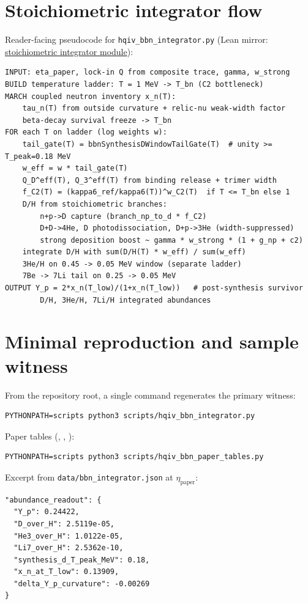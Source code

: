 \documentclass[11pt]{amsart}
\newcommand{\etap}{\ensuremath{\eta_{\mathrm{paper}}}}
\begin{document}
\section{Stoichiometric integrator flow}
\label{app:flow}

Reader-facing pseudocode for \texttt{hqiv\_bbn\_integrator.py} (Lean mirror:
\hyperref[lean:bbn-stoichiometric]{stoichiometric integrator module}):

\begin{verbatim}
INPUT: eta_paper, lock-in Q from composite trace, gamma, w_strong
BUILD temperature ladder: T = 1 MeV -> T_bn (C2 bottleneck)
MARCH coupled neutron inventory x_n(T):
    tau_n(T) from outside curvature + relic-nu weak-width factor
    beta-decay survival freeze -> T_bn
FOR each T on ladder (log weights w):
    tail_gate(T) = bbnSynthesisDWindowTailGate(T)  # unity >= T_peak=0.18 MeV
    w_eff = w * tail_gate(T)
    Q_D^eff(T), Q_3^eff(T) from binding release + trimer width
    f_C2(T) = (kappa6_ref/kappa6(T))^w_C2(T)  if T <= T_bn else 1
    D/H from stoichiometric branches:
        n+p->D capture (branch_np_to_d * f_C2)
        D+D->4He, D photodissociation, D+p->3He (width-suppressed)
        strong deposition boost ~ gamma * w_strong * (1 + g_np + c2)
    integrate D/H with sum(D/H(T) * w_eff) / sum(w_eff)
    3He/H on 0.45 -> 0.05 MeV window (separate ladder)
    7Be -> 7Li tail on 0.25 -> 0.05 MeV
OUTPUT Y_p = 2*x_n(T_low)/(1+x_n(T_low))   # post-synthesis survivor
        D/H, 3He/H, 7Li/H integrated abundances
\end{verbatim}

\section{Minimal reproduction and sample witness}
\label{app:minimal-repro}

From the repository root, a single command regenerates the primary witness:
\begin{verbatim}
PYTHONPATH=scripts python3 scripts/hqiv_bbn_integrator.py
\end{verbatim}
Paper tables (, , ):
\begin{verbatim}
PYTHONPATH=scripts python3 scripts/hqiv_bbn_paper_tables.py
\end{verbatim}
Excerpt from \texttt{data/bbn\_integrator.json} at \etap:
\begin{verbatim}
"abundance_readout": {
  "Y_p": 0.24422,
  "D_over_H": 2.5119e-05,
  "He3_over_H": 1.0122e-05,
  "Li7_over_H": 2.5362e-10,
  "synthesis_d_T_peak_MeV": 0.18,
  "x_n_at_T_low": 0.13909,
  "delta_Y_p_curvature": -0.00269
}
\end{verbatim}
\end{document}

